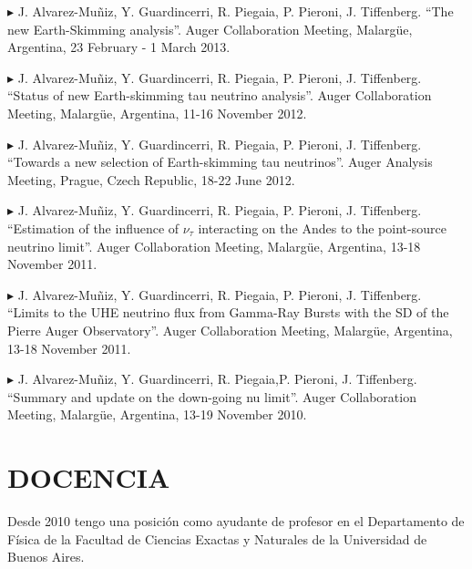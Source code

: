 \documentclass[letterpaper]{article}
\renewenvironment{itemize}{
  \begin{list}{}{
    \setlength{\leftmargin}{1.5em}
  }
}{
  \end{list}
}
\begin{document}
\begin{itemize}
  \item{$\blacktriangleright$} J. Alvarez-Muñiz, Y. Guardincerri, R. Piegaia, P. Pieroni, J. Tiffenberg. ``The new Earth-Skimming analysis''. Auger Collaboration Meeting, Malargüe, Argentina, 23 February - 1 March 2013.
  \item{$\blacktriangleright$} J. Alvarez-Muñiz, Y. Guardincerri, R. Piegaia, P. Pieroni, J. Tiffenberg. ``Status of new Earth-skimming tau neutrino analysis''. Auger Collaboration Meeting, Malargüe, Argentina, 11-16 November 2012.
  \item{$\blacktriangleright$} J. Alvarez-Muñiz, Y. Guardincerri, R. Piegaia, P. Pieroni, J. Tiffenberg. ``Towards a new selection of Earth-skimming tau neutrinos''. Auger Analysis Meeting, Prague, Czech Republic, 18-22 June 2012.
  \item{$\blacktriangleright$} J. Alvarez-Muñiz, Y. Guardincerri, R. Piegaia, P. Pieroni, J. Tiffenberg. ``Estimation of the influence of $\nu_{\tau}$ interacting on the Andes to the point-source neutrino limit''. Auger Collaboration Meeting, Malargüe, Argentina, 13-18 November 2011.
  \item{$\blacktriangleright$} J. Alvarez-Muñiz, Y. Guardincerri, R. Piegaia, P. Pieroni, J. Tiffenberg. ``Limits to the UHE neutrino flux from Gamma-Ray Bursts with the SD of the Pierre Auger Observatory''. Auger Collaboration Meeting, Malargüe, Argentina, 13-18 November 2011.
  \item{$\blacktriangleright$} J. Alvarez-Muñiz, Y. Guardincerri, R. Piegaia,P. Pieroni, J. Tiffenberg. ``Summary and update on the down-going nu limit''. Auger Collaboration Meeting, Malargüe, Argentina, 13-19 November 2010.
 
\end{itemize}


\section*{DOCENCIA}

Desde 2010 tengo una posición como ayudante de profesor en el Departamento de Física de la Facultad de Ciencias Exactas y Naturales de la Universidad de Buenos Aires.
\end{document}
